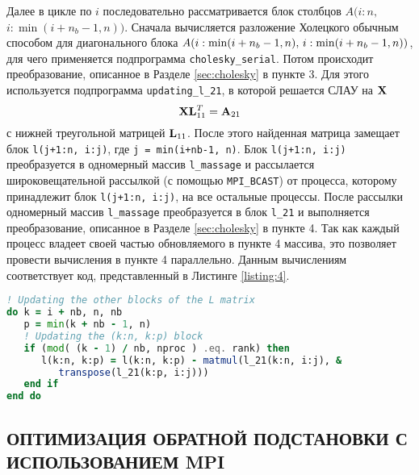 Далее в цикле по $i$ последовательно рассматривается блок столбцов ${A}(i:n,$ $i:\min(i+n_b-1,n))$. Сначала вычисляется разложение Холецкого обычным способом для диагонального блока ${A}\qty(i:\min(i+n_b-1,n),\,i:\min(i+n_b-1,n))$, для чего применяется подпрограмма \texttt{cholesky\_serial}. Потом происходит преобразование, описанное в Разделе \ref{sec:cholesky} в пункте 3. Для этого используется подпрограмма \texttt{updating\_l\_21}, в которой решается СЛАУ на $\vb{X}$
$$
\vb{X} \vb{L}^T_{11} = \vb{A}_{21}
$$
с нижней треугольной матрицей $\vb{L}_{11}$. После этого найденная матрица замещает блок \texttt{l(j+1:n, i:j)}, где \texttt{j = min(i+nb-1, n)}. Блок \texttt{l(j+1:n, i:j)} преобразуется в одномерный массив \texttt{l\_massage} и рассылается широковещательной рассылкой (с помощью \texttt{MPI\_BCAST}) от процесса, которому принадлежит блок \texttt{l(j+1:n, i:j)}, на все остальные процессы. После рассылки одномерный массив \texttt{l\_massage} преобразуется в блок \texttt{l\_21} и выполняется преобразование, описанное в Разделе \ref{sec:cholesky} в пункте 4. Так как каждый процесс владеет своей частью обновляемого в пункте 4 массива, это позволяет провести вычисления в пункте 4 параллельно. Данным вычислениям соответствует код, представленный в Листинге \ref{listing:4}.
\begin{lstlisting}[language=fortran, style=fortran, label={listing:4}, caption={Параллельная реализация преобразования, описанного в Разделе \ref{sec:cholesky} в пункте 4.}]
! Updating the other blocks of the L matrix
do k = i + nb, n, nb
   p = min(k + nb - 1, n)
   ! Updating the (k:n, k:p) block
   if (mod( (k - 1) / nb, nproc ) .eq. rank) then
      l(k:n, k:p) = l(k:n, k:p) - matmul(l_21(k:n, i:j), &
         transpose(l_21(k:p, i:j)))
   end if
end do
\end{lstlisting}

\subsection{ОПТИМИЗАЦИЯ ОБРАТНОЙ ПОДСТАНОВКИ С ИСПОЛЬЗОВАНИЕМ MPI}

